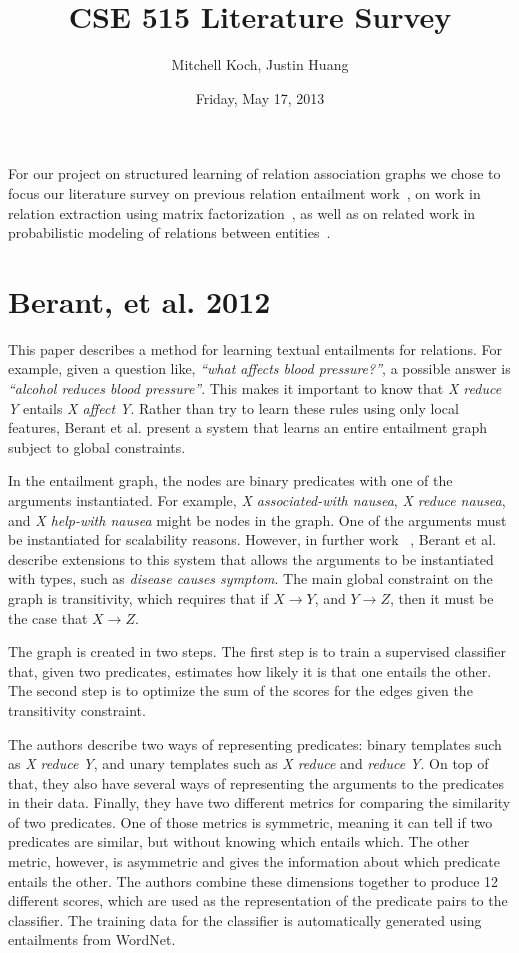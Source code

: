 \documentclass{article}
\author{Mitchell Koch, Justin Huang}
\title{CSE 515 Literature Survey}
\date{Friday, May 17, 2013}
\begin{document}
\maketitle

For our project on structured learning of relation association graphs we chose to focus our literature survey on previous relation entailment work~\cite{Berant:2012:LER:2122944.2122947}, on work in relation extraction using matrix factorization~\cite{riedel13relation}, as well as on related work in probabilistic modeling of relations between entities~\cite{TaskarWAK03}.

\section*{Berant, et al. 2012}

This paper describes a method for learning textual entailments for relations. For example, given a question like, \textit{``what affects blood pressure?''}, a possible answer is \textit{``alcohol reduces blood pressure''}. This makes it important to know that \textit{X reduce Y} entails \textit{X affect Y}. Rather than try to learn these rules using only local features, Berant et al. present a system that learns an entire entailment graph subject to global constraints.

In the entailment graph, the nodes are binary predicates with one of the arguments instantiated. For example, \textit{X associated-with nausea}, \textit{X reduce nausea}, and \textit{X help-with nausea} might be nodes in the graph. One of the arguments must be instantiated for scalability reasons. However, in further work ~\cite{berant2011global}, Berant et al. describe extensions to this system that allows the arguments to be instantiated with types, such as \textit{disease causes symptom}. The main global constraint on the graph is transitivity, which requires that if $X \rightarrow Y$, and $Y \rightarrow Z$, then it must be the case that $X \rightarrow Z$.

The graph is created in two steps. The first step is to train a supervised classifier that, given two predicates, estimates how likely it is that one entails the other. The second step is to optimize the sum of the scores for the edges given the transitivity constraint.

The authors describe two ways of representing predicates: binary templates such as \textit{X reduce Y}, and unary templates such as \textit{X reduce} and \textit{reduce Y}. On top of that, they also have several ways of representing the arguments to the predicates in their data. Finally, they have two different metrics for comparing the similarity of two predicates. One of those metrics is symmetric, meaning it can tell if two predicates are similar, but without knowing which entails which. The other metric, however, is asymmetric and gives the information about which predicate entails the other. The authors combine these dimensions together to produce 12 different scores, which are used as the representation of the predicate pairs to the classifier. The training data for the classifier is automatically generated using entailments from WordNet.
\end{document}
